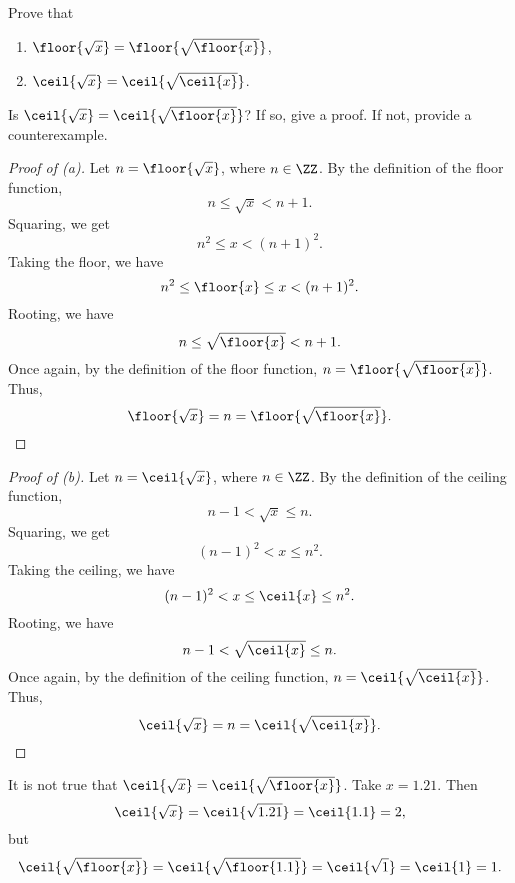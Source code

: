 \begin{problem}
    Prove that
    \begin{enumerate}
        \item $\floor{\sqrt{x}} = \floor{\sqrt{\floor{x}}}$,
        \item $\ceil{\sqrt{x}} = \ceil{\sqrt{\ceil{x}}}$.
    \end{enumerate}

    Is $\ceil{\sqrt{x}} = \ceil{\sqrt{\floor{x}}}$? If so, give a proof. If not, provide a counterexample.
\end{problem}
\begin{proof}[Proof of \emph{(a)}]
    Let $n = \floor{\sqrt{x}}$, where $n \in \ZZ$. By the definition of the floor function, \[n \leq \sqrt{x} < n+1.\] Squaring, we get \[n^2 \leq x < (n+1)^2.\] Taking the floor, we have \[n^2 \leq \floor{x} \leq x < (n+1)^2.\] Rooting, we have \[n \leq \sqrt{\floor{x}} < n+1.\] Once again, by the definition of the floor function, $n = \floor{\sqrt{\floor{x}}}$. Thus, \[\floor{\sqrt{x}} = n = \floor{\sqrt{\floor{x}}}.\]
\end{proof}
\begin{proof}[Proof of \emph{(b)}]
    Let $n = \ceil{\sqrt{x}}$, where $n \in \ZZ$. By the definition of the ceiling function, \[n - 1 < \sqrt{x} \leq n.\] Squaring, we get \[(n-1)^2 < x \leq n^2.\] Taking the ceiling, we have \[(n-1)^2 < x \leq \ceil{x} \leq n^2.\] Rooting, we have \[n-1 < \sqrt{\ceil{x}} \leq n.\] Once again, by the definition of the ceiling function, $n = \ceil{\sqrt{\ceil{x}}}$. Thus, \[\ceil{\sqrt{x}} = n = \ceil{\sqrt{\ceil{x}}}.\]
\end{proof}
\setcounter{partnum}{2}
\begin{ppart}
    It is not true that $\ceil{\sqrt{x}} = \ceil{\sqrt{\floor{x}}}$. Take $x = 1.21$. Then \[\ceil{\sqrt{x}} = \ceil{\sqrt{1.21}} = \ceil{1.1} = 2,\] but \[\ceil{\sqrt{\floor{x}}} = \ceil{\sqrt{\floor{1.1}}} = \ceil{\sqrt{1}} = \ceil{1} = 1.\]
\end{ppart}


